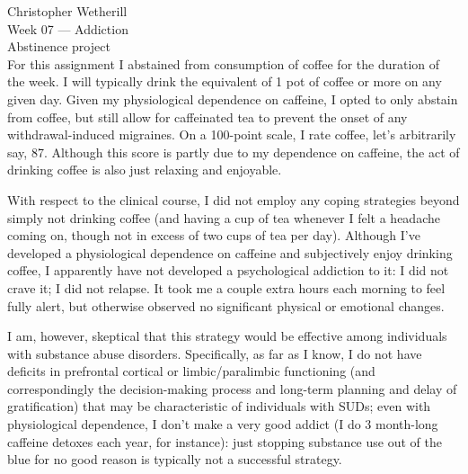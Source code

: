 \documentclass[11pt,final] {article}
\begin{document}

\noindent Christopher Wetherill\\
Week 07 --- Addiction\\
Abstinence project\\[0.25cm]

For this assignment I abstained from consumption of coffee for the duration of the week. I will typically drink the equivalent of 1 pot of coffee or more on any given day. Given my physiological dependence on caffeine, I opted to only abstain from coffee, but still allow for caffeinated tea to prevent the onset of any withdrawal-induced migraines. On a 100-point scale, I rate coffee, let's arbitrarily say, 87. Although this score is partly due to my dependence on caffeine, the act of drinking coffee is also just relaxing and enjoyable.

With respect to the clinical course, I did not employ any coping strategies beyond simply not drinking coffee (and having a cup of tea whenever I felt a headache coming on, though not in excess of two cups of tea per day). Although I've developed a physiological dependence on caffeine and subjectively enjoy drinking coffee, I apparently have not developed a psychological addiction to it: I did not crave it; I did not relapse. It took me a couple extra hours each morning to feel fully alert, but otherwise observed no significant physical or emotional changes.

I am, however, skeptical that this strategy would be effective among individuals with substance abuse disorders. Specifically, as far as I know, I do not have deficits in prefrontal cortical or limbic/paralimbic functioning (and correspondingly the decision-making process and long-term planning and delay of gratification) that may be characteristic of individuals with SUDs; even with physiological dependence, I don't make a very good addict (I do 3 month-long caffeine detoxes each year, for instance): just stopping substance use out of the blue for no good reason is typically not a successful strategy.
\end{document}
